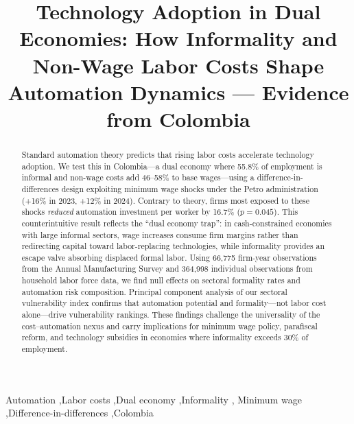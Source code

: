 \documentclass[5p,times,authoryear]{elsarticle}
\begin{document}
\begin{frontmatter}

\title{Technology Adoption in Dual Economies: How Informality and Non-Wage Labor Costs Shape Automation Dynamics --- Evidence from Colombia}


\begin{abstract}
Standard automation theory predicts that rising labor costs accelerate technology adoption. We test this in Colombia---a dual economy where 55.8\% of employment is informal and non-wage costs add 46--58\% to base wages---using a difference-in-differences design exploiting minimum wage shocks under the Petro administration (+16\% in 2023, +12\% in 2024). Contrary to theory, firms most exposed to these shocks \emph{reduced} automation investment per worker by 16.7\% ($p=0.045$). This counterintuitive result reflects the ``dual economy trap'': in cash-constrained economies with large informal sectors, wage increases consume firm margins rather than redirecting capital toward labor-replacing technologies, while informality provides an escape valve absorbing displaced formal labor. Using 66,775 firm-year observations from the Annual Manufacturing Survey and 364,998 individual observations from household labor force data, we find null effects on sectoral formality rates and automation risk composition. Principal component analysis of our sectoral vulnerability index confirms that automation potential and formality---not labor cost alone---drive vulnerability rankings. These findings challenge the universality of the cost--automation nexus and carry implications for minimum wage policy, parafiscal reform, and technology subsidies in economies where informality exceeds 30\% of employment.
\end{abstract}


\begin{keyword}
  Automation \sep Labor costs \sep Dual economy \sep Informality \sep
  Minimum wage \sep Difference-in-differences \sep Colombia
\end{keyword}

\end{frontmatter}
\end{document}
